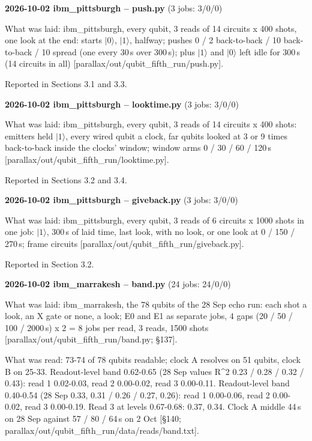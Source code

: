 \documentclass[11pt]{article}
\begin{document}
\textbf{2026-10-02 ibm\_pittsburgh -- push.py} (3 jobs: 3/0/0)

What was laid: ibm\_pittsburgh, every qubit, 3 reads of 14 circuits x 400 shots, one look at the end: starts \(|0\rangle\), \(|1\rangle\), halfway; pushes 0 / 2 back-to-back / 10 back-to-back / 10 spread (one every 30\,\textmu s over 300\,\textmu s); plus \(|1\rangle\) and \(|0\rangle\) left idle for 300\,\textmu s (14 circuits in all) {[}parallax/out/qubit\_fifth\_run/push.py{]}.

Reported in Sections 3.1 and 3.3.

\textbf{2026-10-02 ibm\_pittsburgh -- looktime.py} (3 jobs: 3/0/0)

What was laid: ibm\_pittsburgh, every qubit, 3 reads of 14 circuits x 400 shots: emitters held \(|1\rangle\), every wired qubit a clock, far qubits looked at 3 or 9 times back-to-back inside the clocks' window; window arms 0 / 30 / 60 / 120\,\textmu s {[}parallax/out/qubit\_fifth\_run/looktime.py{]}.

Reported in Sections 3.2 and 3.4.

\textbf{2026-10-02 ibm\_pittsburgh -- giveback.py} (3 jobs: 3/0/0)

What was laid: ibm\_pittsburgh, every qubit, 3 reads of 6 circuits x 1000 shots in one job: \(|1\rangle\), 300\,\textmu s of laid time, last look, with no look, or one look at 0 / 150 / 270\,\textmu s; frame circuits {[}parallax/out/qubit\_fifth\_run/giveback.py{]}.

Reported in Section 3.2.

\textbf{2026-10-02 ibm\_marrakesh -- band.py} (24 jobs: 24/0/0)

What was laid: ibm\_marrakesh, the 78 qubits of the 28 Sep echo run: each shot a look, an X gate or none, a look; E0 and E1 as separate jobs, 4 gaps (20 / 50 / 100 / 2000\,\textmu s) x 2 = 8 jobs per read, 3 reads, 1500 shots {[}parallax/out/qubit\_fifth\_run/band.py; \S{}137{]}.

What was read: 73-74 of 78 qubits readable; clock A resolves on 51 qubits, clock B on 25-33. Readout-level band 0.62-0.65 (28 Sep values R\^{}2 0.23 / 0.28 / 0.32 / 0.43): read 1 0.02-0.03, read 2 0.00-0.02, read 3 0.00-0.11. Readout-level band 0.40-0.54 (28 Sep 0.33, 0.31 / 0.26 / 0.27, 0.26): read 1 0.00-0.06, read 2 0.00-0.02, read 3 0.00-0.19. Read 3 at levels 0.67-0.68: 0.37, 0.34. Clock A middle 44\,\textmu s on 28 Sep against 57 / 80 / 64\,\textmu s on 2 Oct {[}\S{}140; parallax/out/qubit\_fifth\_run/data/reads/band.txt{]}.
\end{document}
